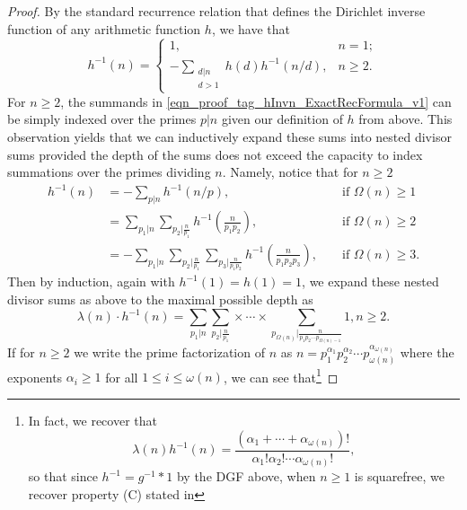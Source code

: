 \documentclass[11pt,reqno,a4letter]{article}
\numberwithin{figure}{section}
\numberwithin{table}{section}
\theoremstyle{plain}
\numberwithin{theorem}{section}
\theoremstyle{definition}
\begin{document}
\begin{proof}
By the standard recurrence relation that defines the Dirichlet inverse function of any 
arithmetic function $h$, we have that \cite[\S 2.7]{APOSTOLANUMT} 
\begin{equation} 
\label{eqn_proof_tag_hInvn_ExactRecFormula_v1}
h^{-1}(n) = \begin{cases} 
            1, & n = 1; \\ 
            -\sum\limits_{\substack{d|n \\ d>1}} h(d) h^{-1}(n/d), & n \geq 2. 
            \end{cases} 
\end{equation} 
For $n \geq 2$, the summands in \eqref{eqn_proof_tag_hInvn_ExactRecFormula_v1} 
can be simply indexed over the primes $p|n$ given our definition of $h$ from above. 
This observation yields that we can inductively 
expand these sums into nested divisor sums provided the depth of the sums does not exceed the 
capacity to index summations over the primes dividing $n$. Namely, notice that for $n \geq 2$ 
\begin{align*} 
h^{-1}(n) & = -\sum_{p|n} h^{-1}(n/p), && \text{\ if\ } \Omega(n) \geq 1 \\ 
     & = \sum_{p_1|n} \sum_{p_2|\frac{n}{p_1}} h^{-1}\left(\frac{n}{p_1p_2}\right), && \text{\ if\ } \Omega(n) \geq 2 \\ 
     & = -\sum_{p_1|n} \sum_{p_2|\frac{n}{p_1}} \sum_{p_3|\frac{n}{p_1p_2}} h^{-1}\left(\frac{n}{p_1p_2p_3}\right), 
     && \text{\ if\ } \Omega(n) \geq 3. 
\end{align*} 
Then by induction, again with $h^{-1}(1) = h(1) = 1$, we expand these 
nested divisor sums as above to the maximal possible depth as 
\begin{equation} 
\label{eqn_proof_tag_hInvn_ExactNestedSumFormula_v2} 
\lambda(n) \cdot h^{-1}(n) = \sum_{p_1|n} \sum_{p_2|\frac{n}{p_1}} \times \cdots \times 
     \sum_{p_{\Omega(n)}|\frac{n}{p_1p_2 \cdots p_{\Omega(n)-1}}} 1, n \geq 2. 
\end{equation} 
If for $n \geq 2$ we write the prime factorization of $n$ as 
$n = p_1^{\alpha_1} p_2^{\alpha_2} \cdots p_{\omega(n)}^{\alpha_{\omega(n)}}$ where the exponents $\alpha_i \geq 1$ 
for all $1 \leq i \leq \omega(n)$, we can see that\footnote{
     In fact, we recover that 
     \[
     \lambda(n) h^{-1}(n) = \frac{(\alpha_1+\cdots+\alpha_{\omega(n)})!}{ 
          \alpha_1! \alpha_2! \cdots \alpha_{\omega(n)}!}, 
     \]
     so that since $h^{-1} = g^{-1} \ast 1$ by the DGF above, when $n \geq 1$ is 
     squarefree, we recover property (C) stated in 
}
\end{proof}
\end{document}
